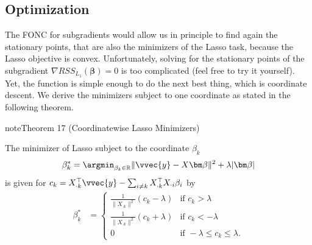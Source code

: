 \documentclass[letterpaper,10pt,english]{jupyterBook}
\begin{document}
\subsection{Optimization}
\label{\detokenize{regression_lasso:optimization}}
\sphinxAtStartPar
The FONC for subgradients would allow us in principle to find again the stationary points, that are also the minimizers of the Lasso task, because the Lasso objective is convex. Unfortunately, solving for the stationary points of the subgradient \(\nabla RSS_{L_1}(\bm\beta)=0\) is too complicated (feel free to try it yourself). Yet, the function is simple enough to do the next best thing, which is coordinate descent. We derive the minimizers subject to one coordinate as stated in the following theorem.
\label{regression_lasso:theorem-0}
\begin{sphinxadmonition}{note}{Theorem 17 (Coordinate\sphinxhyphen{}wise Lasso Minimizers)}



\sphinxAtStartPar
The minimizer of Lasso subject to the coordinate \(\beta_k\)
\begin{equation*}
\begin{split}\beta_k^* = \argmin_{\beta_k\in\mathbb{R}} \lVert\vvec{y}-X\bm\beta\rVert^2+\lambda\lvert\bm\beta\rvert\end{split}
\end{equation*}
is given for \(c_k =  X_{\cdot k}^\top \vvec{y}- \sum_{i\neq k}X_{\cdot k}^\top X_{\cdot i}\beta_i\) by
\label{equation:regression_lasso:27dcb775-df9e-4a12-a9d4-8250e749df20}\begin{align}
\beta_k^*&= \begin{cases}
\frac{1}{\lVert X_{\cdot k}\rVert^2}(c_k -\lambda) & \text{if } c_k>\lambda\\
\frac{1}{\lVert X_{\cdot k}\rVert^2}(c_k +\lambda) & \text{if } c_k<-\lambda\\
0 & \text{if } -\lambda\leq c_k\leq \lambda.
\end{cases}
\end{align}\end{sphinxadmonition}
\end{document}
